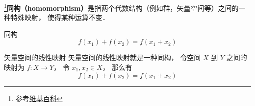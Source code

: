 
\begin{issues}
\end{issues}


\footnote{参考\href{https://en.wikipedia.org/wiki/Homomorphism}{维基百科}}\textbf{同构（homomorphism）}是指两个代数结构（例如群，矢量空间等）之间的一种特殊映射， 使得某种运算不变．

\begin{definition}{同构}
\begin{equation}
f(x_1) + f(x_2) = f(x_1 + x_2)
\end{equation}
\end{definition}

\begin{example}{矢量空间的线性映射}
矢量空间的线性映射就是一种同构， 令空间 $X$ 到 $Y$ 之间的映射为 $f:X\to Y$， 令 $x_1, x_2\in X$， 那么有
\begin{equation}
f(x_1) + f(x_2) = f(x_1 + x_2)
\end{equation}
\end{example}
